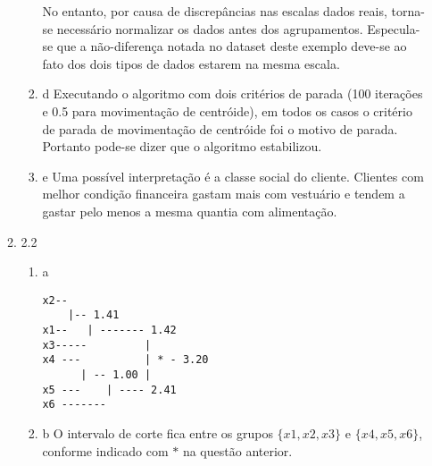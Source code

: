 \documentclass[11pt]{article}
\begin{document}
\begin{enumerate}
\begin{enumerate}
\begin{enumerate}
No entanto, por causa de discrepâncias nas escalas dados reais, torna-se
necessário normalizar os dados antes dos agrupamentos. Especula-se que a
não-diferença notada no dataset deste exemplo deve-se ao fato dos dois tipos de
dados estarem na mesma escala.
                    \item{d} Executando o algoritmo com dois critérios de parada (100 iterações e 0.5
para movimentação de centróide), em todos os casos o critério de parada de
movimentação de centróide foi o motivo de parada. Portanto pode-se dizer que o
algoritmo estabilizou.
                    \item{e} Uma possível interpretação é a classe social do cliente. Clientes com
melhor condição financeira gastam mais com vestuário e tendem a gastar pelo menos
a mesma quantia com alimentação. 
                \end{enumerate}
            \item{2.2}
                \begin{enumerate}
                    \item{a}
                    \begin{verbatim}
x2--
    |-- 1.41
x1--   | ------- 1.42
x3-----         |
x4 ---          | * - 3.20 
      | -- 1.00 |
x5 ---    | ---- 2.41
x6 -------
                    \end{verbatim}
                    \item{b} O intervalo de corte fica entre os grupos $\{x1, x2, x3\}$ e $\{x4, x5, x6\}$, conforme indicado com $*$ na questão anterior.
                \end{enumerate}
        \end{enumerate}
\end{enumerate}
\end{document}
